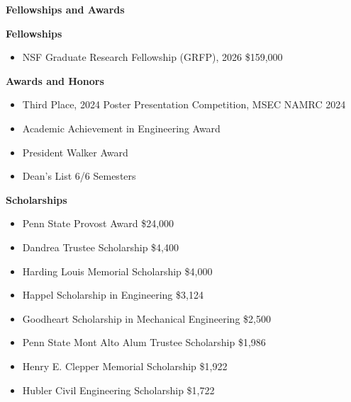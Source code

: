 \begin{center}
    \textbf{Fellowships and Awards}
\end{center}

\textbf{Fellowships}
\begin{itemize}[noitemsep, topsep=0pt, partopsep=0pt, parsep=0pt]
    \item NSF Graduate Research Fellowship (GRFP), 2026 \hfill \$159,000
\end{itemize}

\vspace{6pt}

\textbf{Awards and Honors}
\begin{itemize}[noitemsep, topsep=0pt, partopsep=0pt, parsep=0pt]
    \item Third Place, 2024 Poster Presentation Competition, MSEC NAMRC 2024
    \item Academic Achievement in Engineering Award
    \item President Walker Award
    \item Dean's List 6/6 Semesters
\end{itemize}

\vspace{6pt}

\textbf{Scholarships}
\begin{itemize}[noitemsep, topsep=0pt, partopsep=0pt, parsep=0pt]
    \item Penn State Provost Award \hfill \$24,000
    \item Dandrea Trustee Scholarship \hfill \$4,400
    \item Harding Louis Memorial Scholarship \hfill \$4,000
    \item Happel Scholarship in Engineering \hfill \$3,124
    \item Goodheart Scholarship in Mechanical Engineering \hfill \$2,500
    \item Penn State Mont Alto Alum Trustee Scholarship \hfill \$1,986
    \item Henry E. Clepper Memorial Scholarship \hfill \$1,922
    \item Hubler Civil Engineering Scholarship \hfill \$1,722
\end{itemize}
